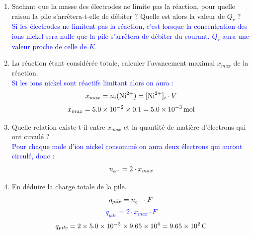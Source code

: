 \documentclass[a4paper,11pt,fleqn]{article}%
\begin{document}
\begin{enumerate}
\begin{enumerate}[label=\theenumi.\arabic*]
		\item Sachant que la masse des électrodes ne limite pas la réaction, pour quelle raison la pile s'arrêtera-t-elle de débiter ? Quelle est alors la valeur de $Q_r$ ?\\
		\textcolor{blue}{Si les électrodes ne limitent pas la réaction, c'est lorsque la concentration des ions nickel sera nulle que la pile s'arrêtera de débiter du courant. $Q_r$ aura une valeur proche de celle de $K$.}
		\item La réaction étant considérée totale, calculer l'avancement maximal $x_{max}$ de la réaction.\\
		\textcolor{blue}{Si les ions nickel sont réactifs limitant alors on aura : $$x_{max} = n_i(\ce{Ni^2+}) = [\ce{Ni^2+}]_i\cdot V$$
		$$x_{max} = \num{5,0E-2} \times \num{0,1} = \SI{5,0E-3}{\mole}$$}
		\item Quelle relation existe-t-il entre $x_{max}$ et la quantité de matière d'électrons qui ont circulé ?\\
		\textcolor{blue}{Pour chaque mole d'ion nickel consommé on aura deux électrons qui auront circulé, donc :$$n_{\ce{e-}} = 2\cdot x_{max}$$}
		\item En déduire la charge totale de la pile.\\
		\textcolor{blue}{$$q_{pile} = n_{\ce{e-}} \cdot F$$
		$$q_{pile} = 2\cdot x_{max} \cdot F$$
		$$q_{pile} = 2\times \num{5,0E-3} \times  \num{9,65E4} =\SI{9,65E2}{C}$$}
	\end{enumerate}
\end{enumerate}
\end{document}
